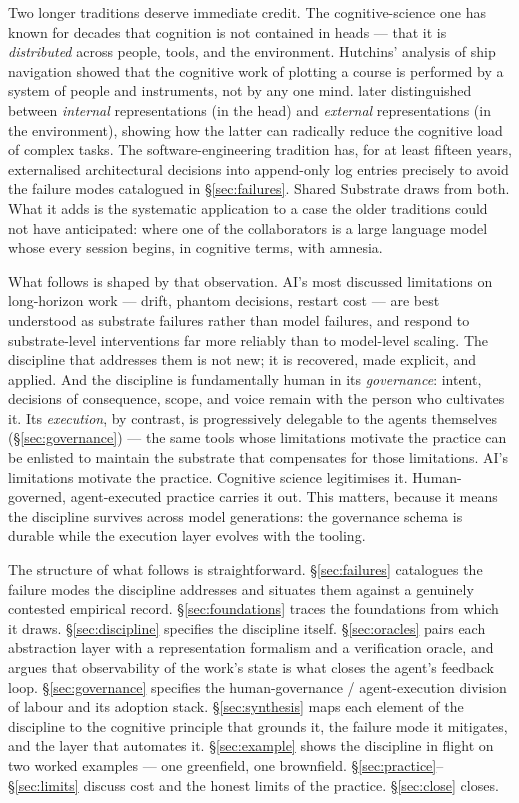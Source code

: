 \documentclass[11pt,a4paper,twocolumn]{article}
\begin{document}
Two longer traditions deserve immediate credit. The cognitive-science
one has known for decades that cognition is not contained in heads
--- that it is \emph{distributed} across people, tools, and the
environment. Hutchins' analysis of ship navigation \citep{hutchins1995}
showed that the cognitive work of plotting a course is performed by a
system of people and instruments, not by any one mind.
\citet{scaife1996external} later distinguished between
\emph{internal} representations (in the head) and \emph{external}
representations (in the environment), showing how the latter can
radically reduce the cognitive load of complex tasks. The
software-engineering tradition has, for at least fifteen years,
externalised architectural decisions into append-only log entries
\citep{nygard2011adr} precisely to avoid the failure modes
catalogued in \S\ref{sec:failures}. Shared Substrate draws from
both. What it adds is the systematic application to a case the older
traditions could not have anticipated: where one of the
collaborators is a large language model whose every session begins,
in cognitive terms, with amnesia.

What follows is shaped by that observation. AI's most discussed
limitations on long-horizon work --- drift, phantom decisions,
restart cost --- are best understood as substrate failures rather
than model failures, and respond to substrate-level interventions
far more reliably than to model-level scaling. The discipline that
addresses them is not new; it is recovered, made explicit, and
applied. And the discipline is fundamentally human in its
\emph{governance}: intent, decisions of consequence, scope, and
voice remain with the person who cultivates it. Its
\emph{execution}, by contrast, is progressively delegable to the
agents themselves (\S\ref{sec:governance}) --- the same tools whose
limitations motivate the practice can be enlisted to maintain the
substrate that compensates for those limitations. AI's limitations
motivate the practice. Cognitive science legitimises it.
Human-governed, agent-executed practice carries it out. This
matters, because it means the discipline survives across model
generations: the governance schema is durable while the execution
layer evolves with the tooling.

The structure of what follows is straightforward.
\S\ref{sec:failures} catalogues the failure modes the discipline
addresses and situates them against a genuinely contested empirical
record. \S\ref{sec:foundations} traces the foundations from which
it draws. \S\ref{sec:discipline} specifies the discipline itself.
\S\ref{sec:oracles} pairs each abstraction layer with a
representation formalism and a verification oracle, and argues
that observability of the work's state is what closes the agent's
feedback loop. \S\ref{sec:governance} specifies the human-governance /
agent-execution division of labour and its adoption stack.
\S\ref{sec:synthesis} maps each element of the discipline to the
cognitive principle that grounds it, the failure mode it mitigates,
and the layer that automates it. \S\ref{sec:example} shows the
discipline in flight on two worked examples --- one greenfield,
one brownfield. \S\ref{sec:practice}--\S\ref{sec:limits} discuss
cost and the honest limits of the practice. \S\ref{sec:close}
closes.
\end{document}
